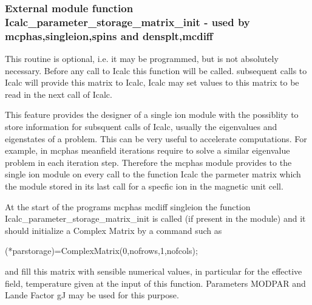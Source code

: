 \subsubsection{External module function {\prg Icalc\_parameter\_storage\_matrix\_init} - used by {\prg %
mcphas},{\prg singleion},{\prg spins} and {\prg %
densplt},{\prg mcdiff}  }

This routine is optional, i.e. it may be programmed, but is not absolutely necessary.
Before any call to Icalc this function will be called. subsequent calls to Icalc will provide this matrix to %
Icalc, Icalc may set values to this matrix to be read in the next call
of Icalc.

This feature provides the designer of a single ion module  with the possiblity to store information for subsquent %
calls of Icalc,
 usually the eigenvalues and eigenstates of a problem. This can be very useful to accelerate computations. For %
example, in {\prg mcphas} meanfield iterations require
to solve a similar eigenvalue problem in each iteration step. Therefore the {\prg mcphas} module provides
to the single ion module on every call to the function {\prg Icalc} the parmeter matrix {\prg }
which the module stored in its last call for a specfic ion in the magnetic unit cell.

At the start of the programs {\prg mcphas} {\prg mcdiff} {\prg singleion} the function {\prg %
Icalc\_parameter\_storage\_matrix\_init}
is called (if present in the module) and it should initialize a Complex Matrix by a command such as

{\prg (*parstorage)=ComplexMatrix(0,nofrows,1,nofcols);}

and fill this matrix with sensible numerical values, in particular for the effective field, temperature given at %
the input of this function.
Parameters {\prg MODPAR} and Lande Factor {\prg gJ} may be used for this purpose.

